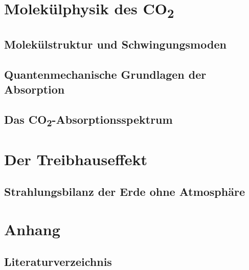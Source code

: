 \documentclass[12pt,a4paper]{article}
\begin{document}
\section{Molekülphysik des CO\textsubscript{2}}

\subsection{Molekülstruktur und Schwingungsmoden}

\subsection{Quantenmechanische Grundlagen der Absorption}

\subsection{Das CO\textsubscript{2}-Absorptionsspektrum}

\section{Der Treibhauseffekt}

\subsection{Strahlungsbilanz der Erde ohne Atmosphäre}

\newpage
\section{Anhang}

\subsection{Literaturverzeichnis}
\printbibliography[heading=none]

\end{document}
